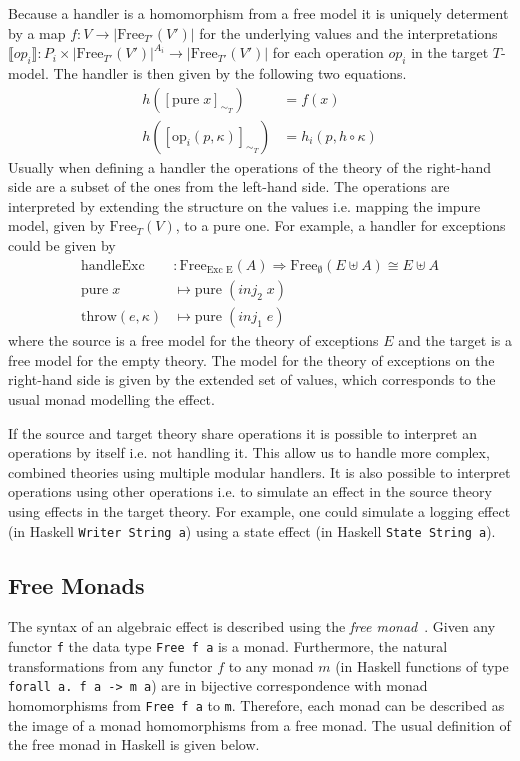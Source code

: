 Because a handler is a homomorphism from a free model it is uniquely determent
by a map $f : V \rightarrow |\mathrm{Free}_{T'}(V')|$ for the underlying
values and the interpretations $\lBrack op_i \rBrack : P_i \times
|\mathrm{Free}_{T'}(V')|^{A_i} \rightarrow |\mathrm{Free}_{T'}(V')|$ for each
operation $op_i$ in the target $T$-model.
The handler is then given by the following two equations.
\begin{align*}
  h([\mathrm{pure}\;x]_{\sim_T}) &= f(x) \\
  h([\mathrm{op}_i(p,\kappa)]_{\sim_T}) &= h_i(p, h\circ\kappa )
\end{align*}
Usually when defining a handler the operations of the theory of the right-hand
side are a subset of the ones from the left-hand side.
The operations are interpreted by extending the structure on the values i.e.
mapping the impure model, given by $\mathrm{Free}_T(V)$, to a pure one.
For example, a handler for exceptions could be given by
\begin{align*}
  \mathrm{handleExc} &: \mathrm{Free}_{\text{Exc E}}(A) \Rightarrow
  \mathrm{Free}_\emptyset(E \uplus A) \cong E \uplus A \\
  \mathrm{pure}\;x&\mapsto \mathrm{pure}\; (inj_2\; x) \\
  \mathrm{throw}(e, \kappa)&\mapsto \mathrm{pure}\; (inj_1\; e) 
\end{align*}
where the source is a free model for the theory of exceptions $E$ and the target
is a free model for the empty theory.
The model for the theory of exceptions on the right-hand side is given by the
extended set of values, which corresponds to the usual monad modelling the
effect.

If the source and target theory share operations it is possible to interpret an
operations by itself i.e. not handling it.
This allow us to handle more complex, combined theories using multiple modular
handlers.
It is also possible to interpret operations using other operations i.e. to
simulate an effect in the source theory using effects in the target theory.
For example, one could simulate a logging effect (in Haskell \texttt{Writer String
  a}) using a state effect (in Haskell \texttt{State String a}).


\subsection{Free Monads}
\label{preliminaries:free-monad}

The syntax of an algebraic effect is described using the \textit{free
monad}~\cite{DBLP:journals/jfp/Swierstra08}.
Given any functor \texttt{f} the data type \texttt{Free f a} is a monad.
Furthermore, the natural transformations from any functor $f$ to any monad $m$
(in Haskell functions of type \texttt{forall a. f a -> m a}) are in bijective
correspondence with monad homomorphisms from \texttt{Free f a} to \texttt{m}.
Therefore, each monad can be described as the image of a monad homomorphisms
from a free monad.
The usual definition of the free monad in Haskell is given below.

